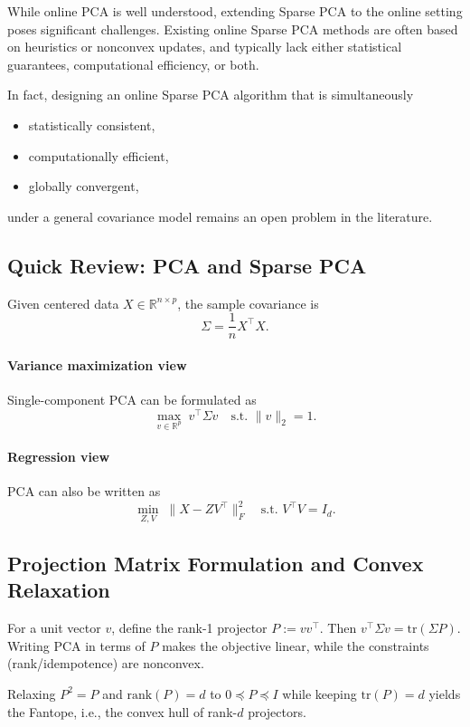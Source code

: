 \documentclass[12pt]{article}
\begin{document}
While online PCA is well understood, extending Sparse PCA to the online setting
poses significant challenges. Existing online Sparse PCA methods are often based on
heuristics or nonconvex updates, and typically lack either statistical guarantees,
computational efficiency, or both.

In fact, designing an online Sparse PCA algorithm that is simultaneously
\begin{itemize}
    \item statistically consistent,
    \item computationally efficient,
    \item globally convergent,
\end{itemize}
under a general covariance model remains an open problem in the literature.

\subsection{Quick Review: PCA and Sparse PCA}

Given centered data $X \in \mathbb{R}^{n \times p}$, the sample covariance is
\[
\Sigma = \frac{1}{n} X^\top X.
\]

\paragraph{Variance maximization view}
Single-component PCA can be formulated as
\[
\max_{v \in \mathbb{R}^p} \; v^\top \Sigma v \quad \text{s.t. } \|v\|_2 = 1.
\]

\paragraph{Regression view}
PCA can also be written as
\[
\min_{Z,V} \; \|X - ZV^\top\|_F^2 \quad \text{s.t. } V^\top V = I_d.
\]

\subsection{Projection Matrix Formulation and Convex Relaxation}

For a unit vector $v$, define the rank-1 projector $P := vv^\top$. Then
$v^\top \Sigma v = \mathrm{tr}(\Sigma P)$.
Writing PCA in terms of $P$ makes the objective linear, while the constraints
(rank/idempotence) are nonconvex.

Relaxing $P^2=P$ and $\mathrm{rank}(P)=d$ to $0 \preceq P \preceq I$ while keeping
$\mathrm{tr}(P)=d$ yields the Fantope, i.e., the convex hull of rank-$d$ projectors.
\end{document}
